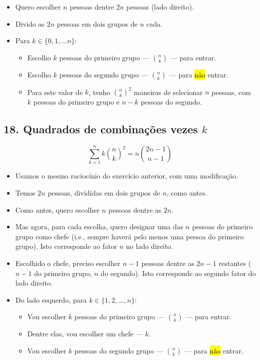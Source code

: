 \documentclass[
  11pt]{report}
\begin{document}
\begin{itemize}
\item
  Quero escolher $n$ pessoas dentre $2n$ pessoas (lado direito).
\item
  Divido as $2n$ pessoas em dois grupos de $n$ cada.
\item
  Para $k \in \{0, 1, \ldots n\}$:

  \begin{itemize}
  \item
    Escolho $k$ pessoas do primeiro grupo --- $\binom{n}{k}$ --- para entrar.
  \item
    Escolho $k$ pessoas do segundo grupo --- $\binom{n}{k}$ --- para {\hl{não}} entrar.
  \item
    Para este valor de $k$, tenho $\binom{n}{k}^2$ maneiras de selecionar $n$ pessoas, com $k$ pessoas do primeiro grupo e $n-k$ pessoas do segundo.
  \end{itemize}
\end{itemize}

\hypertarget{quadrados-de-combinauxe7uxf5es-vezes-k}{%
\subsection*{\texorpdfstring{18. Quadrados de combinações vezes $k$}{18. Quadrados de combinações vezes }}\label{quadrados-de-combinauxe7uxf5es-vezes-k}}

\begin{rmdbox}
\[
\sum_{k = 1}^n k\binom{n}{k}^2 = n\binom{2n-1}{n-1}
\]

\end{rmdbox}

\begin{itemize}
\item
  Usamos o mesmo raciocínio do exercício anterior, com uma modificação.
\item
  Temos $2n$ pessoas, divididas em dois grupos de $n$, como antes.
\item
  Como antes, quero escolher $n$ pessoas dentre as $2n$.
\item
  Mas agora, para cada escolha, quero designar uma das $n$ pessoas do primeiro grupo como chefe (i.e., sempre haverá pelo menos uma pessoa do primeiro grupo). Isto corresponde ao fator $n$ no lado direito.
\item
  Escolhido o chefe, preciso escolher $n - 1$ pessoas dentre as $2n - 1$ restantes ($n - 1$ do primeiro grupo, $n$ do segundo). Isto corresponde ao segundo fator do lado direito.
\item
  Do lado esquerdo, para $k \in \{1, 2, \ldots, n \}$:

  \begin{itemize}
  \item
    Vou escolher $k$ pessoas do primeiro grupo --- $\binom{n}{k}$ --- para entrar.
  \item
    Dentre elas, vou escolher um chefe --- $k$.
  \item
    Vou escolher $k$ pessoas do segundo grupo --- $\binom{n}{k}$ --- para {\hl{não}} entrar.
  \end{itemize}
\end{itemize}
\end{document}
